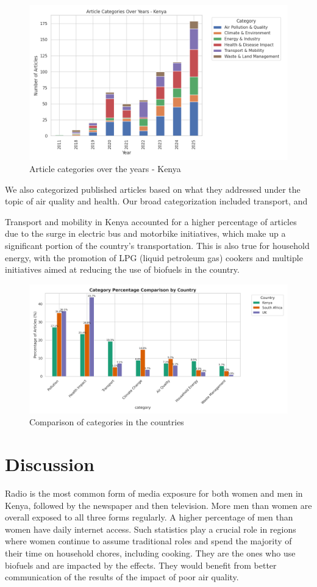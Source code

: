 \documentclass{article}
\begin{document}
\begin{figure}
    \centering
    \includegraphics[width=0.5\linewidth]{kenya_stacked_bar (1).png}
    \caption{Article categories over the years - Kenya}
    \label{fig:placeholder}
\end{figure}

We also categorized published articles based on what they addressed under the topic of air quality and health. Our broad categorization included transport, and 

Transport and mobility in Kenya accounted for a higher percentage of articles due to the surge in electric bus and motorbike initiatives, which make up a significant portion of the country's transportation. This is also true for household energy, with the promotion of LPG (liquid petroleum gas) cookers and multiple initiatives aimed at reducing the use of biofuels in the country. 

\begin{figure}
    \centering
    \includegraphics[width=0.5\linewidth]{category_percentage_comparison.png}
    \caption{Comparison of categories in the countries}
    \label{fig:placeholder}
\end{figure}


\section{Discussion}
Radio is the most common form of media exposure for both women and men in Kenya, followed by the newspaper and then television. More men than women are overall exposed to all three forms regularly. A higher percentage of men than women have daily internet access. Such statistics play a crucial role in regions where women continue to assume traditional roles and spend the majority of their time on household chores, including cooking. They are the ones who use biofuels and are impacted by the effects. They would benefit from better communication of the results of the impact of poor air quality.
\end{document}
